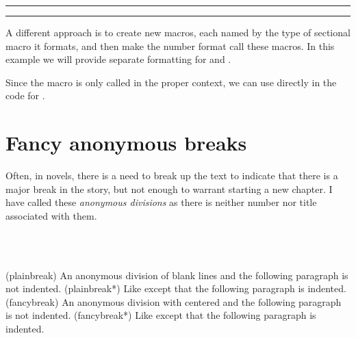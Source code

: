 \fancybreak{$*$}
\fancybreak{}


A different approach is to create new macros, each named by the type
of sectional macro it formats, and then make the number format call
these macros.
In this example we will provide separate formatting for \cmd{\section} and \cmd{\subsection}.
\begin{lcode}
  \newcommand\sectionsecnumformat{\thesection:\quad}
  \newcommand\subsectionsecnumformat{\fbox{\enspace\thesubsection\enspace}\enspace}
\end{lcode}
Since the macro is only called in the proper context, we can use
\cmd{\thesection} directly in the code for \cmd{\section}.







\section{Fancy anonymous breaks}

    Often, in novels, there is a need to break up the text to indicate that
there is a major break in the story, but not enough to warrant starting a new
chapter. I have called these
\emph{anonymous divisions}
as there is neither number nor title associated with them.

\begin{syntax}
\cmd{\plainbreak} \cmd{\plainbreak*}  \\
\cmd{\fancybreak} \cmd{\fancybreak*}   \\
\end{syntax}
\glossary(plainbreak)%
  {}%
  {An anonymous division of  blank lines and the following
   paragraph is not indented.}
\glossary(plainbreak*)%
  {}%
  {Like  except that the following paragraph is indented.}
\glossary(fancybreak)%
  {}%
  {An anonymous division with  centered and the following
   paragraph is not indented.}
\glossary(fancybreak*)%
  {}%
  {Like  except that the following paragraph is indented.}

